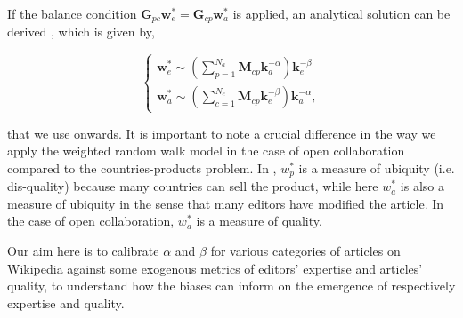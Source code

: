 If the balance condition $\mathbf{G}_{pc} \mathbf{w}^*_e = \mathbf{G}_{cp} \mathbf{w}^*_a$
is applied, an analytical solution can be derived \cite{caldarelli}, which is given by,

\begin{equation}
\begin{cases}
 \mathbf{w}^*_e \sim (\sum^{N_a}_{p=1} \mathbf{M}_{cp} \mathbf{k}_a^{-\alpha}) \mathbf{k}_e^{-\beta} \\
\mathbf{w}^*_a \sim (\sum^{N_e}_{c=1} \mathbf{M}_{cp} \mathbf{k}_e^{-\beta}) \mathbf{k}_a^{-\alpha},
\end{cases}
\end{equation}


that we use onwards. It is important to note a crucial difference in the way we apply the weighted random walk model in the case of open collaboration compared to the countries-products problem. In \cite{caldarelli2012network}, $w^*_p$ is a measure of ubiquity (i.e. dis-quality) because many countries can sell the product, while here $w^*_a$ is also a measure of ubiquity in the sense that many editors have modified the article. In the case of open collaboration, $w^*_a$ is a measure of quality.

Our aim here is to calibrate $\alpha$ and $\beta$ for various categories of articles on Wikipedia against some exogenous metrics of editors' expertise and articles' quality, to understand how the biases can inform on the emergence of respectively expertise and quality.
